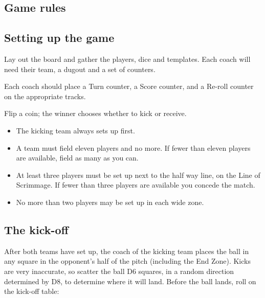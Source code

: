 \begin{multicols}{2}

\section{Game rules}

\subsection{Setting up the game}
\par Lay out the board and gather the players, dice and templates. Each coach will need their team, a dugout and a set of counters.
\par Each coach should place a Turn counter, a Score counter, and a Re-roll counter on the appropriate tracks.
\par Flip a coin; the winner chooses whether to kick or receive.

\begin{itemize}
\item The kicking team always sets up first.
\item A team must field eleven players and no more. If fewer than eleven players are available, field as many as you can.
\item At least three players must be set up next to the half way line, on the Line of Scrimmage. If fewer than three players are available you concede the match.
\item No more than two players may be set up in each wide zone.
\end{itemize}

\subsection{The kick-off}
\par After both teams have set up, the coach of the kicking team places the ball in any square in the opponent's half of the pitch (including the End Zone). Kicks are very inaccurate, so scatter the ball D6 squares, in a random direction determined by D8, to determine where it will land. Before the ball lands, roll on the kick-off table:


\end{multicols}
